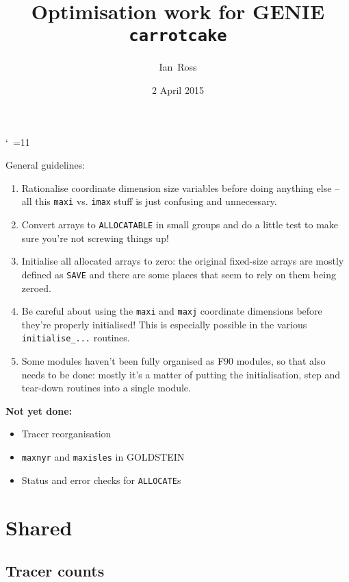\documentclass[a4paper,10pt,article]{memoir}
\title{Optimisation work for GENIE \texttt{carrotcake}}
\author{Ian~Ross}
\date{2 April 2015}
\begin{document}
\catcode`~=11    %

\maketitle

General guidelines:
\begin{enumerate}
  \item{Rationalise coordinate dimension size variables before doing
    anything else -- all this \texttt{maxi} vs. \texttt{imax} stuff is
    just confusing and unnecessary.}
  \item{Convert arrays to \texttt{ALLOCATABLE} in small groups and do
    a little test to make sure you're not screwing things up!}
  \item{Initialise all allocated arrays to zero: the original
    fixed-size arrays are mostly defined as \texttt{SAVE} and there
    are some places that seem to rely on them being zeroed.}
  \item{Be careful about using the \texttt{maxi} and \texttt{maxj}
    coordinate dimensions before they're properly initialised!  This
    is especially possible in the various \texttt{initialise\_...}
    routines.}
  \item{Some modules haven't been fully organised as F90 modules, so
    that also needs to be done: mostly it's a matter of putting the
    initialisation, step and tear-down routines into a single module.}
\end{enumerate}

\textbf{Not yet done:}
\begin{itemize}
  \item{Tracer reorganisation}
  \item{\texttt{maxnyr} and \texttt{maxisles} in GOLDSTEIN}
  \item{Status and error checks for \texttt{ALLOCATE}s}
\end{itemize}

\chapter{Shared}

\section{Tracer counts}
\end{document}
